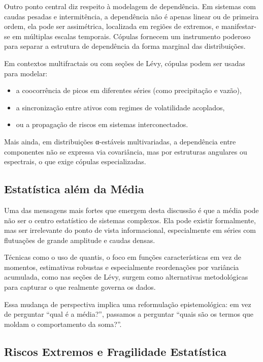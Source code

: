 \documentclass[
]{agujournal2019}
\providecommand{\tightlist}{%
  \setlength{\itemsep}{0pt}\setlength{\parskip}{0pt}}\usepackage{longtable,booktabs,array}
\begin{document}
Outro ponto central diz respeito à modelagem de dependência. Em sistemas
com caudas pesadas e intermitência, a dependência não é apenas linear ou
de primeira ordem, ela pode ser assimétrica, localizada em regiões de
extremos, e manifestar-se em múltiplas escalas temporais. Cópulas
fornecem um instrumento poderoso para separar a estrutura de dependência
da forma marginal das distribuições.

Em contextos multifractais ou com seções de Lévy, cópulas podem ser
usadas para modelar:

\begin{itemize}
\tightlist
\item
  a coocorrência de picos em diferentes séries (como precipitação e
  vazão),
\item
  a sincronização entre ativos com regimes de volatilidade acoplados,
\item
  ou a propagação de riscos em sistemas interconectados.
\end{itemize}

Mais ainda, em distribuições α-estáveis multivariadas, a dependência
entre componentes não se expressa via covariância, mas por estruturas
angulares ou espectrais, o que exige cópulas especializadas.

\subsection{Estatística além da
Média}\label{estatuxedstica-aluxe9m-da-muxe9dia}

Uma das mensagens mais fortes que emergem desta discussão é que a média
pode não ser o centro estatístico de sistemas complexos. Ela pode
existir formalmente, mas ser irrelevante do ponto de vista
informacional, especialmente em séries com flutuações de grande
amplitude e caudas densas.

Técnicas como o uso de quantis, o foco em funções características em vez
de momentos, estimativas robustas e especialmente reordenações por
variância acumulada, como nas seções de Lévy, surgem como alternativas
metodológicas para capturar o que realmente governa os dados.

Essa mudança de perspectiva implica uma reformulação epistemológica: em
vez de perguntar ``qual é a média?'', passamos a perguntar ``quais são
os termos que moldam o comportamento da soma?''.

\subsection{Riscos Extremos e Fragilidade
Estatística}\label{riscos-extremos-e-fragilidade-estatuxedstica}
\end{document}
